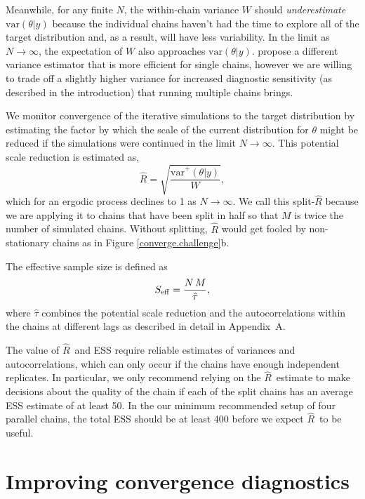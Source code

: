 \documentclass[american,]{article}
\newcommand{\Rhat}{$\widehat{R}$}
\theoremstyle{definition}
\begin{document}
Meanwhile, for any finite \(N\), the within-chain variance \(W\) should
\emph{underestimate} \(\mbox{var}(\theta |y)\) because the
individual chains haven't had the time to explore all of the target
distribution and, as a result, will have less variability. In the limit
as \(N\rightarrow\infty\), the expectation of \(W\) also approaches
\(\mbox{var}(\theta |y)\). \citet{vats2018revisiting} propose a different variance estimator that is more efficient for single chains, however we are willing to trade off a slightly higher variance for increased diagnostic sensitivity (as described in the introduction) that running multiple chains brings.

We monitor convergence of the iterative simulations to the target
distribution by estimating the factor by which the scale of the current
distribution for \(\theta\) might be reduced if the simulations were
continued in the limit \(N\rightarrow\infty\). This potential scale
reduction is estimated as,
\begin{equation}
\widehat{R} = \sqrt{\frac{\widehat{\mbox{var}}^+(\theta | y)}{W}},
\end{equation}
which for an ergodic process declines to 1 as \(N\rightarrow\infty\). We call this
split-\(\widehat{R}\) because we are applying it to chains that
have been split in half so that \(M\) is twice the number of simulated
chains. Without splitting, \(\widehat{R}\) would get fooled by
non-stationary chains as in Figure \ref{converge.challenge}b.

The effective sample size is defined as 
\begin{equation}
S_{\rm eff} = \frac{N \, M}{\hat{\tau}},
\end{equation}
where $\hat{\tau}$ combines the potential scale reduction and the
autocorrelations within the chains at different lags as described in
detail in Appendix~A.

The value of \Rhat\ and ESS require reliable estimates of variances and autocorrelations, which can
only occur if the chains have enough independent replicates. In particular, we only recommend 
relying on the \Rhat\ estimate to make decisions about the quality of the chain if each of the 
split chains has an average ESS estimate of at least 50. In the our minimum recommended setup of four
parallel chains, the total ESS should be at least 400 before we expect  \Rhat\ to be useful.


\hypertarget{improving-convergence-diagnostics}{%
\section{Improving convergence
diagnostics}\label{improving-convergence-diagnostics}}
\end{document}
